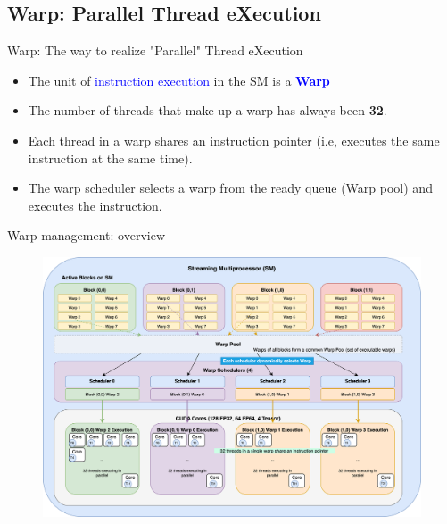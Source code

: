 \documentclass[dvipdfmx, 11pt, aspectratio=169]{beamer}   %
\begin{document}
\subsection{Warp: Parallel Thread eXecution}
\begin{frame}{Warp: The way to realize "Parallel" Thread eXecution}
  \begin{itemize}
    \item The unit of \textcolor{blue}{instruction execution} in the SM is a \textcolor{blue}{\textbf{Warp}}
    \item The number of threads that make up a warp has always been \textbf{32}.
    \item Each thread in a warp shares an instruction pointer (i.e, executes the same instruction at the same time).
    \item The warp scheduler selects a warp from the ready queue (Warp pool) and executes the instruction.
  \end{itemize}
\end{frame}
\begin{frame}{Warp management: overview}
  \begin{figure}
    \includegraphics[scale=0.075]{img/warpScheduling.png}
  \end{figure}
\end{frame}
\end{document}
